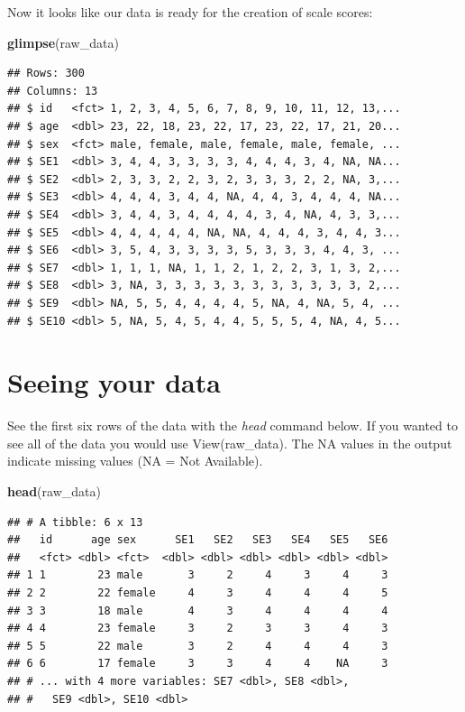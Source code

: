 \documentclass[
]{krantz}
\makeatletter
\newenvironment{Shaded}{\begin{snugshade}}{\end{snugshade}}
\newcommand{\KeywordTok}[1]{\textcolor[rgb]{0.27,0.27,0.27}{\textbf{#1}}}
\newcommand{\NormalTok}[1]{#1}
\newenvironment{kframe}{%
\medskip{}
\setlength{\fboxsep}{.8em}
 \def\at@end@of@kframe{}%
 \ifinner\ifhmode%
  \def\at@end@of@kframe{\end{minipage}}%
  \begin{minipage}{\columnwidth}%
 \fi\fi%
 \def\FrameCommand##1{\hskip\@totalleftmargin \hskip-\fboxsep
 \colorbox{shadecolor}{##1}\hskip-\fboxsep
     \hskip-\linewidth \hskip-\@totalleftmargin \hskip\columnwidth}%
 \MakeFramed {\advance\hsize-\width
   \@totalleftmargin\z@ \linewidth\hsize
   \@setminipage}}%
 {\par\unskip\endMakeFramed%
 \at@end@of@kframe}
\renewenvironment{Shaded}{\begin{kframe}}{\end{kframe}}
\makeatother
\begin{document}
Now it looks like our data is ready for the creation of scale scores:

\begin{Shaded}
\begin{Highlighting}[]
\KeywordTok{glimpse}\NormalTok{(raw_data)}
\end{Highlighting}
\end{Shaded}

\begin{verbatim}
## Rows: 300
## Columns: 13
## $ id   <fct> 1, 2, 3, 4, 5, 6, 7, 8, 9, 10, 11, 12, 13,...
## $ age  <dbl> 23, 22, 18, 23, 22, 17, 23, 22, 17, 21, 20...
## $ sex  <fct> male, female, male, female, male, female, ...
## $ SE1  <dbl> 3, 4, 4, 3, 3, 3, 3, 4, 4, 4, 3, 4, NA, NA...
## $ SE2  <dbl> 2, 3, 3, 2, 2, 3, 2, 3, 3, 3, 2, 2, NA, 3,...
## $ SE3  <dbl> 4, 4, 4, 3, 4, 4, NA, 4, 4, 3, 4, 4, 4, NA...
## $ SE4  <dbl> 3, 4, 4, 3, 4, 4, 4, 4, 3, 4, NA, 4, 3, 3,...
## $ SE5  <dbl> 4, 4, 4, 4, 4, NA, NA, 4, 4, 4, 3, 4, 4, 3...
## $ SE6  <dbl> 3, 5, 4, 3, 3, 3, 3, 5, 3, 3, 3, 4, 4, 3, ...
## $ SE7  <dbl> 1, 1, 1, NA, 1, 1, 2, 1, 2, 2, 3, 1, 3, 2,...
## $ SE8  <dbl> 3, NA, 3, 3, 3, 3, 3, 3, 3, 3, 3, 3, 3, 2,...
## $ SE9  <dbl> NA, 5, 5, 4, 4, 4, 4, 5, NA, 4, NA, 5, 4, ...
## $ SE10 <dbl> 5, NA, 5, 4, 5, 4, 4, 5, 5, 5, 4, NA, 4, 5...
\end{verbatim}

\hypertarget{seeing-your-data}{%
\section{Seeing your data}\label{seeing-your-data}}

See the first six rows of the data with the \emph{head} command below. If you wanted to see all of the data you would use View(raw\_data). The NA values in the output indicate missing values (NA = Not Available).

\begin{Shaded}
\begin{Highlighting}[]
\KeywordTok{head}\NormalTok{(raw_data)}
\end{Highlighting}
\end{Shaded}

\begin{verbatim}
## # A tibble: 6 x 13
##   id      age sex      SE1   SE2   SE3   SE4   SE5   SE6
##   <fct> <dbl> <fct>  <dbl> <dbl> <dbl> <dbl> <dbl> <dbl>
## 1 1        23 male       3     2     4     3     4     3
## 2 2        22 female     4     3     4     4     4     5
## 3 3        18 male       4     3     4     4     4     4
## 4 4        23 female     3     2     3     3     4     3
## 5 5        22 male       3     2     4     4     4     3
## 6 6        17 female     3     3     4     4    NA     3
## # ... with 4 more variables: SE7 <dbl>, SE8 <dbl>,
## #   SE9 <dbl>, SE10 <dbl>
\end{verbatim}
\end{document}
